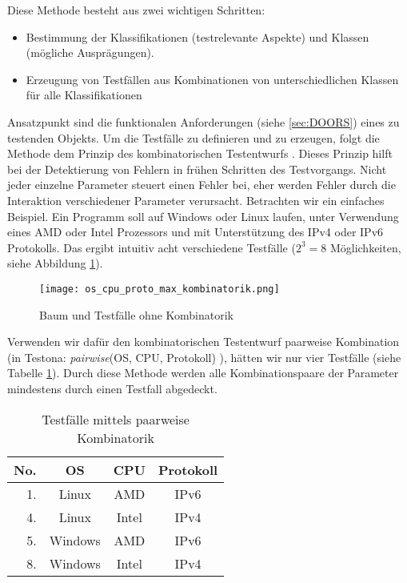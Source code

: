  Diese Methode besteht aus zwei wichtigen Schritten:
\begin{itemize}
\item Bestimmung der Klassifikationen (testrelevante Aspekte) und Klassen (mögliche Ausprägungen).
\item Erzeugung von Testfällen aus Kombinationen von unterschiedlichen Klassen für alle Klassifikationen
\end{itemize}

Ansatzpunkt sind die funktionalen Anforderungen (siehe \ref{sec:DOORS}) eines zu testenden Objekts. Um die Testfälle zu definieren und zu erzeugen, folgt die Methode dem Prinzip des kombinatorischen Testentwurfs \cite{KlassifikationsbaumMethode}. Dieses Prinzip hilft bei der Detektierung von Fehlern in frühen Schritten des Testvorgangs. Nicht jeder einzelne Parameter steuert einen Fehler bei, eher werden Fehler durch die Interaktion verschiedener Parameter verursacht. Betrachten wir ein einfaches Beispiel. Ein Programm soll auf Windows oder Linux laufen, unter Verwendung eines AMD oder Intel Prozessors und mit Unterstützung des IPv4 oder IPv6 Protokolls. Das ergibt intuitiv acht verschiedene Testfälle ($2^{3} = 8$ Möglichkeiten, siehe Abbildung \ref{ttn.no_kombi}).\\

\begin{figure}[h]
  \begin{center}
    \texttt{[image: os\_cpu\_proto\_max\_kombinatorik.png]}
  		  \caption{Baum und Testfälle ohne Kombinatorik}
     \label{ttn.no_kombi}
  \end{center}
\end{figure}


Verwenden wir dafür den kombinatorischen Testentwurf \glqq paarweise Kombination\grqq~ (in Testona: \textit{pairwise}(OS, CPU, Protokoll) ), hätten wir nur vier Testfälle (siehe Tabelle \ref{table:4TestCases}). Durch diese Methode werden alle Kombinationspaare der Parameter mindestens durch einen Testfall abgedeckt\cite{CombinatorialSoftTesting}.\\

\begin{table}[h]


\begin{center}
	\begin{tabular}{|r||c|c|c|}
	 \hline
	 No. &OS &CPU &Protokoll\\
	 \hline \hline
	 1. &Linux &AMD &IPv6\\
	 \hline
	 4. &Linux &Intel &IPv4\\
	 \hline
	 5. &Windows &AMD &IPv6\\
	 \hline
	 8. &Windows &Intel &IPv4\\
	 \hline
	\end{tabular}
	
	\caption{Testfälle mittels paarweise Kombinatorik}
	\label{table:4TestCases}
\end{center}

\end{table}


